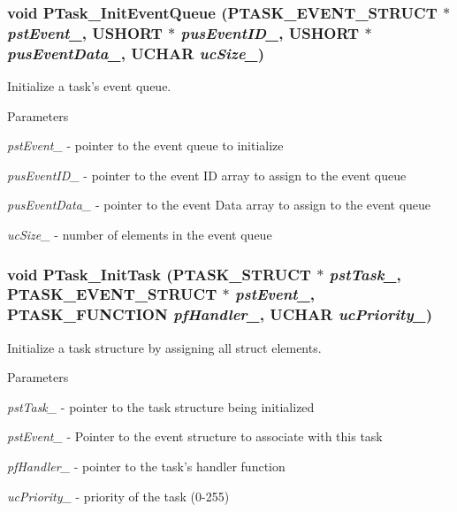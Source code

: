 \subsubsection[{PTask\_\-InitEventQueue}]{\setlength{\rightskip}{0pt plus 5cm}void PTask\_\-InitEventQueue ({\bf PTASK\_\-EVENT\_\-STRUCT} $\ast$ {\em pstEvent\_\-}, \/  USHORT $\ast$ {\em pusEventID\_\-}, \/  USHORT $\ast$ {\em pusEventData\_\-}, \/  UCHAR {\em ucSize\_\-})}\label{ptask_8c_ac4d6c8726a09d28163d130e2127f5675}
Initialize a task's event queue.


\begin{DoxyParams}{Parameters}
\item[{\em pstEvent\_\-}]-\/ pointer to the event queue to initialize \item[{\em pusEventID\_\-}]-\/ pointer to the event ID array to assign to the event queue \item[{\em pusEventData\_\-}]-\/ pointer to the event Data array to assign to the event queue \item[{\em ucSize\_\-}]-\/ number of elements in the event queue \end{DoxyParams}
\subsubsection[{PTask\_\-InitTask}]{\setlength{\rightskip}{0pt plus 5cm}void PTask\_\-InitTask ({\bf PTASK\_\-STRUCT} $\ast$ {\em pstTask\_\-}, \/  {\bf PTASK\_\-EVENT\_\-STRUCT} $\ast$ {\em pstEvent\_\-}, \/  {\bf PTASK\_\-FUNCTION} {\em pfHandler\_\-}, \/  UCHAR {\em ucPriority\_\-})}\label{ptask_8c_afc6ef5c29c45a543b76723f6a8c93664}
Initialize a task structure by assigning all struct elements.


\begin{DoxyParams}{Parameters}
\item[{\em pstTask\_\-}]-\/ pointer to the task structure being initialized \item[{\em pstEvent\_\-}]-\/ Pointer to the event structure to associate with this task \item[{\em pfHandler\_\-}]-\/ pointer to the task's handler function \item[{\em ucPriority\_\-}]-\/ priority of the task (0-\/255) \end{DoxyParams}
